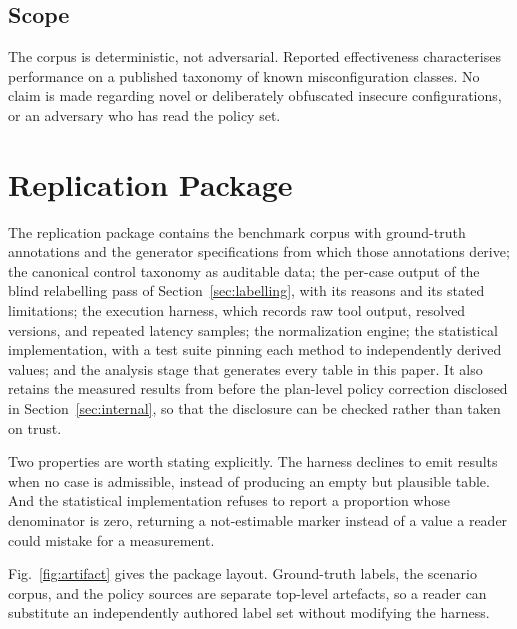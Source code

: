 \documentclass[journal]{IEEEtran}
\begin{document}
\subsection{Scope}
The corpus is deterministic, not adversarial. Reported effectiveness
characterises performance on a published taxonomy of known misconfiguration
classes. No claim is made regarding novel or deliberately obfuscated insecure
configurations, or an adversary who has read the policy set.

\section{Replication Package}

The replication package contains the benchmark corpus with ground-truth
annotations and the generator specifications from which those annotations derive;
the canonical control taxonomy as auditable data; the per-case output of the blind
relabelling pass of Section~\ref{sec:labelling}, with its reasons and its stated
limitations; the execution harness, which records raw tool output, resolved
versions, and repeated latency samples; the normalization engine; the statistical
implementation, with a test suite pinning each method to independently derived
values; and the analysis stage that generates every table in this paper. It also
retains the measured results from before the plan-level policy correction disclosed
in Section~\ref{sec:internal}, so that the disclosure can be checked rather than
taken on trust.

Two properties are worth stating explicitly. The harness declines to emit results
when no case is admissible, instead of producing an empty but plausible table.
And the statistical implementation refuses to report a proportion whose
denominator is zero, returning a not-estimable marker instead of a value a reader
could mistake for a measurement.

Fig.~\ref{fig:artifact} gives the package layout. Ground-truth labels, the
scenario corpus, and the policy sources are separate top-level artefacts, so a
reader can substitute an independently authored label set without modifying the
harness.
\end{document}
